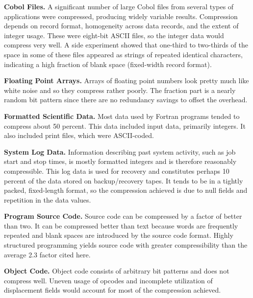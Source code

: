 \vspace{10pt}

\textbf{Cobol Files.} A significant number of large Cobol files from several types of applications were compressed, producing widely variable results. Compression depends on record format, homogeneity across data records, and the extent of integer usage. These were eight-bit ASCII files, so the integer data would compress very well. A side experiment showed that one-third to two-thirds of the space in some of these files appeared as strings of repeated identical characters, indicating a high fraction of blank space (fixed-width record format).

\vspace{10pt}

\textbf{Floating Point Arrays.} Arrays of floating point numbers look pretty much like white noise and so they compress rather poorly. The fraction part is a nearly random bit pattern since there are no redundancy savings to offset the overhead.

\vspace{10pt}

\textbf{Formatted Scientific Data.} Most data used by Fortran programs tended to compress about 50 percent. This data included input data, primarily integers. It also included print files, which were ASCII-coded.

\vspace{10pt}

\textbf{System Log Data.} Information describing past system activity, such as job start and stop times, is mostly formatted integers and is therefore reasonably compressible. This log data is used for recovery and constitutes perhaps 10 percent of the data stored on backup/recovery tapes. It tends to be in a tightly packed, fixed-length format, so the compression achieved is due to null fields and repetition in the data values.


\vspace{10pt}

\textbf{Program Source Code.} Source code can be compressed by a factor of better than two. It can be compressed better than text because words are frequently repeated and blank spaces are introduced by the source code format. Highly structured programming yields source code with greater compressibility than the average 2.3 factor cited here.

\vspace{10pt}
\textbf{Object Code.} Object code consists of arbitrary bit patterns and does not compress well. Uneven usage of opcodes and incomplete utilization of displacement fields would account for most of the compression achieved.

